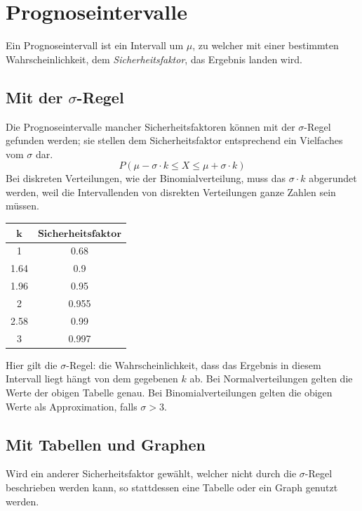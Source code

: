 \documentclass{article}
\begin{document}
 
\section{Prognoseintervalle}
Ein Prognoseintervall ist ein Intervall um $\mu$, zu welcher mit einer bestimmten Wahrscheinlichkeit, dem \emph{Sicherheitsfaktor}, das Ergebnis landen wird.
 
\subsection{Mit der $\sigma$-Regel} 
\begin{minipage}{\dimexpr\linewidth-6cm}
Die Prognoseintervalle mancher Sicherheitsfaktoren können mit der $\sigma$-Regel gefunden werden; sie stellen dem Sicherheitsfaktor entsprechend ein Vielfaches vom $\sigma$ dar.
\[
 P(\mu-\sigma \cdot k \le X \le \mu+\sigma \cdot k) 
\]
Bei diskreten Verteilungen, wie der Binomialverteilung, muss das $\sigma \cdot k$ abgerundet werden, weil die Intervallenden von disrekten Verteilungen ganze Zahlen sein müssen. 
\end{minipage}
\hfill 
\begin{minipage}{6cm}
\begin{center}
\begin{tabular}{ cc }
 $\mathbf{k}$ & $\textbf{Sicherheitsfaktor}$ \\
\midrule
 1 & 0.68 \\
 1.64 & 0.9 \\
 1.96 & 0.95 \\
 2 & 0.955 \\
 2.58 & 0.99 \\
 3 & 0.997 \\
\end{tabular}
\end{center}
\end{minipage} 
 
\vspace*{0.3em} 
\noindent Hier gilt die $\sigma$-Regel: die Wahrscheinlichkeit, dass das Ergebnis in diesem Intervall liegt hängt von dem gegebenen $k$ ab. Bei Normalverteilungen gelten die Werte der obigen Tabelle genau. Bei Binomialverteilungen gelten die obigen Werte als Approximation, falls $\sigma > 3$.
 
\subsection{Mit Tabellen und Graphen}
Wird ein anderer Sicherheitsfaktor gewählt, welcher nicht durch die $\sigma$-Regel beschrieben werden kann, so stattdessen eine Tabelle oder ein Graph genutzt werden.
 
\end{document}
